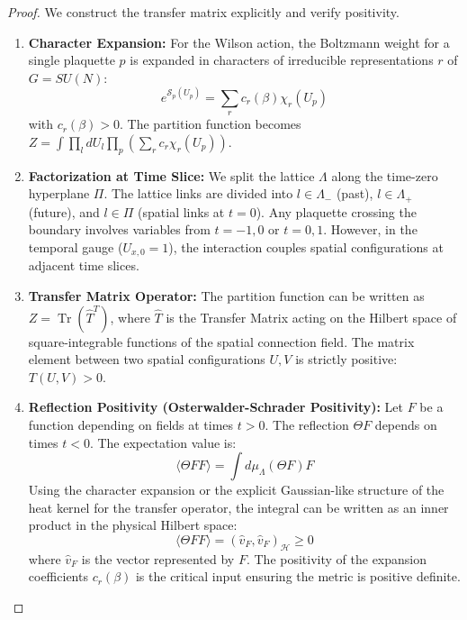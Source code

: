 \begin{proof}
We construct the transfer matrix explicitly and verify positivity.
\begin{enumerate}
    \item \textbf{Character Expansion:} For the Wilson action, the Boltzmann weight for a single plaquette $p$ is expanded in characters of irreducible representations $r$ of $G=SU(N)$:
    \begin{equation}
    e^{\mathcal{S}_p(U_p)} = \sum_{r} c_r(\beta) \chi_r(U_p)
    \end{equation}
    with $c_r(\beta) > 0$. The partition function becomes $Z = \int \prod_l dU_l \prod_p (\sum_r c_r \chi_r(U_p))$.
    
    \item \textbf{Factorization at Time Slice:} We split the lattice $\Lambda$ along the time-zero hyperplane $\Pi$. The lattice links are divided into $l \in \Lambda_-$ (past), $l \in \Lambda_+$ (future), and $l \in \Pi$ (spatial links at $t=0$). Any plaquette crossing the boundary involves variables from $t=-1, 0$ or $t=0, 1$. However, in the temporal gauge ($U_{x, 0} = 1$), the interaction couples spatial configurations at adjacent time slices.
    
    \item \textbf{Transfer Matrix Operator:} The partition function can be written as $Z = \operatorname{Tr}(\hat{T}^T)$, where $\hat{T}$ is the Transfer Matrix acting on the Hilbert space of square-integrable functions of the spatial connection field. The matrix element between two spatial configurations $U, V$ is strictly positive: $T(U, V) > 0$.
    
    \item \textbf{Reflection Positivity (Osterwalder-Schrader Positivity):} Let $F$ be a function depending on fields at times $t > 0$. The reflection $\Theta F$ depends on times $t < 0$. The expectation value is:
    \[
    \langle \Theta F F \rangle = \int d\mu_\Lambda (\Theta F) F
    \]
    Using the character expansion or the explicit Gaussian-like structure of the heat kernel for the transfer operator, the integral can be written as an inner product in the physical Hilbert space:
    \[
    \langle \Theta F F \rangle = (\hat{v}_F, \hat{v}_F)_{\mathcal{H}} \ge 0
    \]
    where $\hat{v}_F$ is the vector represented by $F$. The positivity of the expansion coefficients $c_r(\beta)$ is the critical input ensuring the metric is positive definite.
\end{enumerate}
\end{proof}

